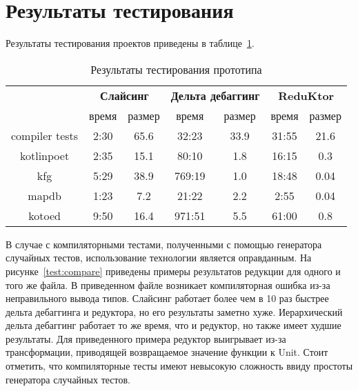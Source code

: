 \section{Результаты тестирования}
Результаты тестирования проектов приведены в таблице~\ref{tab:testing}.
\begin{table}[]
\center
\caption{\label{tab:testing}Результаты тестирования прототипа}
\begin{tabular}{| c | c | c | c | c | c | c |}
\hline
\bf \multirow{2}{*}{Проект} & \multicolumn{2}{|c|}{\bf Слайсинг} & \multicolumn{2}{|c|}{\bf Дельта дебаггинг}  & \multicolumn{2}{|c|}{\bf ReduKtor} \\
\cline{2-7}
& время & размер & время & размер & время & размер \\
\hline
compiler tests & 2:30 & 65.6 & 32:23 & 33.9 & 31:55 & 21.6 \\
\hline
kotlinpoet & 2:35 & 15.1 & 80:10 & 1.8 & 16:15 & 0.3 \\
\hline
kfg & 5:29 & 38.9 & 769:19 & 1.0 & 18:48 & 0.04 \\
\hline
mapdb & 1:23 & 7.2 & 21:22 & 2.2 & 2:55 & 0.04 \\
\hline
kotoed & 9:50 & 16.4 & 971:51 & 5.5 & 61:00 & 0.8 \\
\hline
\end{tabular}
\end{table}
В случае с компиляторными тестами, полученными с помощью генератора случайных тестов, использование технологии является оправданным. На рисунке~\ref{test:compare} приведены примеры результатов редукции для одного и того же файла. В приведенном файле возникает компиляторная ошибка из-за неправильного вывода типов. Слайсинг работает более чем в 10 раз быстрее дельта дебаггинга и редуктора, но его результаты заметно хуже. Иерархический дельта дебаггинг работает то же время, что и редуктор, но также имеет худшие результаты. Для приведенного примера редуктор выигрывает из-за трансформации, приводящей возвращаемое значение функции к Unit. Стоит отметить, что компиляторные тесты имеют невысокую сложность ввиду простоты генератора случайных тестов.
